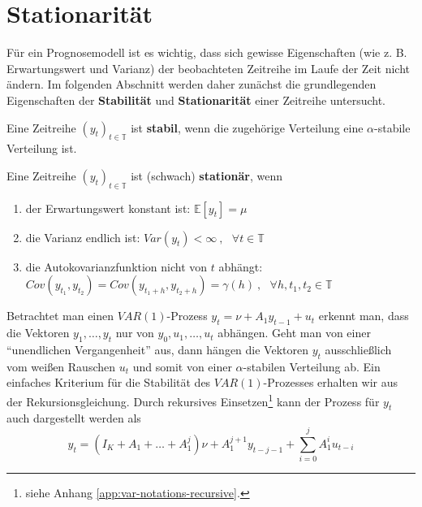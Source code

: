 \documentclass[
	a4paper,
	12pt,
	bibliography=totocnumbered,
	twoside,
]{scrreprt}
\begin{document}
\section{Stationarität}
Für ein Prognosemodell ist es wichtig, dass sich gewisse Eigenschaften (wie z. B. Erwartungswert und Varianz) der beobachteten Zeitreihe im Laufe der Zeit nicht ändern. Im folgenden Abschnitt werden daher zunächst die grundlegenden Eigenschaften der \textbf{Stabilität} und \textbf{Stationarität} einer Zeitreihe untersucht.\\

\clearpage

\begin{Definition}
	Eine Zeitreihe $(y_t)_{t \in \mathbb{T}}$ ist \textbf{stabil}, wenn die zugehörige Verteilung eine $\alpha$-stabile Verteilung ist.\\
\end{Definition}


\begin{Definition}[Stationarität]
	Eine Zeitreihe $(y_t)_{t \in \mathbb{T}}$ ist (schwach) \textbf{stationär}, wenn 
	\begin{enumerate}
		\item der Erwartungswert konstant ist: $\mathbb{E}\left[ y_t \right] = \mu$
		\item die Varianz endlich ist: $Var(y_t) < \infty \ , \ \ \ \forall t \in \mathbb{T}$
		\item die Autokovarianzfunktion nicht von $t$ abhängt: \\ $Cov\left( y_{t_1}, y_{t_2} \right) = Cov\left( y_{t_1+h}, y_{t_2+h} \right) = \gamma(h) \ , \ \ \ \forall h, t_1, t_2 \in \mathbb{T}$
	\end{enumerate}
\end{Definition}



Betrachtet man einen $VAR(1)$-Prozess $y_t = \nu + A_1 y_{t-1} + u_t$ erkennt man, dass die Vektoren $y_1, \ldots , y_t$ nur von $y_0, u_1, \ldots, u_t$ abhängen. Geht man von einer "`unendlichen Vergangenheit"' aus, dann hängen die Vektoren $y_t$ ausschließlich vom weißen Rauschen $u_t$ und somit von einer $\alpha$-stabilen Verteilung ab. Ein einfaches Kriterium für die Stabilität des $VAR(1)$-Prozesses erhalten wir aus der Rekursionsgleichung. Durch rekursives Einsetzen\footnote{siehe Anhang \ref{app:var-notations-recursive}.} kann der Prozess für $y_t$ auch dargestellt werden als\begin{equation}
	y_t = (I_K + A_1 + \ldots + A_1^j) \nu + A_1^{j+1} y_{t-j-1} + \sum_{i=0}^{j} A_1^i u_{t-i}
\end{equation}
\end{document}
